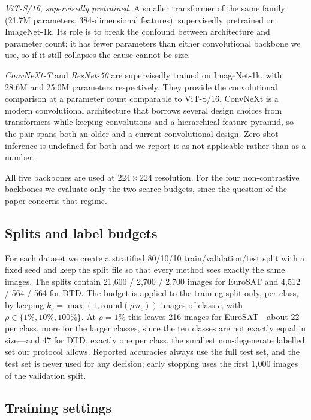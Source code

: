 \documentclass[preprint,12pt]{elsarticle}
\begin{document}
\emph{ViT-S/16, supervisedly pretrained.} A smaller transformer of the same
family (21.7M parameters, 384-dimensional features), supervisedly pretrained on
ImageNet-1k. Its role is to break the confound between architecture and
parameter count: it has fewer parameters than either convolutional backbone we
use, so if it still collapses the cause cannot be size.

\emph{ConvNeXt-T} \cite{liu2022convnext} and \emph{ResNet-50}
\cite{he2016resnet} are supervisedly trained on ImageNet-1k, with 28.6M and
25.0M parameters respectively. They provide the convolutional comparison at a
parameter count comparable to ViT-S/16. ConvNeXt is a modern convolutional
architecture that borrows several design choices from transformers while keeping
convolutions and a hierarchical feature pyramid, so the pair spans both an
older and a current convolutional design. Zero-shot inference is undefined for both and we report it as not
applicable rather than as a number.

All five backbones are used at $224\times224$ resolution. For the four
non-contrastive backbones we evaluate only the two scarce budgets, since the
question of the paper concerns that regime.

\subsection{Splits and label budgets}

For each dataset we create a stratified 80/10/10 train/validation/test split
with a fixed seed and keep the split file so that every method sees exactly the
same images. The splits contain 21{,}600 / 2{,}700 / 2{,}700 images for EuroSAT
and 4{,}512 / 564 / 564 for DTD. The budget is applied to the training split
only, per class, by keeping $k_c = \max(1, \mathrm{round}(\rho\, n_c))$ images of
class $c$, with $\rho \in \{1\%, 10\%, 100\%\}$. At $\rho=1\%$ this leaves 216
images for EuroSAT---about 22 per class, more for the larger classes, since the
ten classes are not exactly equal in size---and 47 for DTD, exactly one per
class, the smallest non-degenerate labelled set our protocol allows. Reported
accuracies always use the full test set, and the test set is never used for any
decision; early stopping uses the first 1{,}000 images of the validation split.

\subsection{Training settings}
\label{sec:training}
\end{document}

